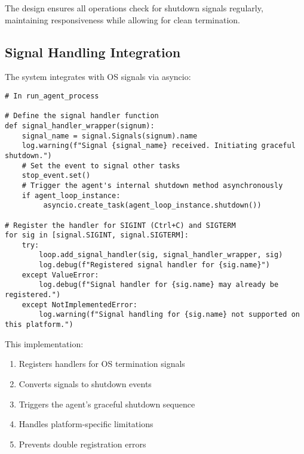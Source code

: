 \documentclass[12pt,a4paper]{article}
\begin{document}
The design ensures all operations check for shutdown signals regularly, maintaining responsiveness while allowing for clean termination.

\subsection*{Signal Handling Integration}

The system integrates with OS signals via asyncio:
\begin{pageablecode}
\begin{verbatim}
# In run_agent_process

# Define the signal handler function
def signal_handler_wrapper(signum):
    signal_name = signal.Signals(signum).name
    log.warning(f"Signal {signal_name} received. Initiating graceful shutdown.")
    # Set the event to signal other tasks
    stop_event.set()
    # Trigger the agent's internal shutdown method asynchronously
    if agent_loop_instance:
         asyncio.create_task(agent_loop_instance.shutdown())

# Register the handler for SIGINT (Ctrl+C) and SIGTERM
for sig in [signal.SIGINT, signal.SIGTERM]:
    try:
        loop.add_signal_handler(sig, signal_handler_wrapper, sig)
        log.debug(f"Registered signal handler for {sig.name}")
    except ValueError:
        log.debug(f"Signal handler for {sig.name} may already be registered.")
    except NotImplementedError:
        log.warning(f"Signal handling for {sig.name} not supported on this platform.")
\end{verbatim}
\end{pageablecode}
This implementation:
\begin{enumerate}[label=\arabic*.]
    \item Registers handlers for OS termination signals
    \item Converts signals to shutdown events
    \item Triggers the agent's graceful shutdown sequence
    \item Handles platform-specific limitations
    \item Prevents double registration errors
\end{enumerate}
\end{document}
